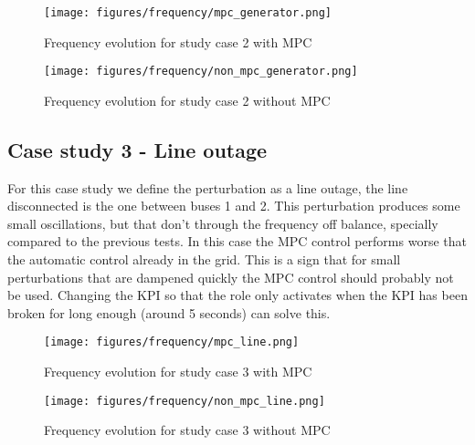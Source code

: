 \documentclass{article}
\begin{document}
\begin{figure}[H]
    \centering

    \begin{minipage}{0.7\textwidth}
        \centering
        \texttt{[image: figures/frequency/mpc\_generator.png]}
        \caption{Frequency evolution for study case 2 with MPC}
        \label{fig:frequency_response_3}
    \end{minipage}

    \vspace{0.5cm}  %

    \begin{minipage}{0.7\textwidth}
        \centering
        \texttt{[image: figures/frequency/non\_mpc\_generator.png]}
        \caption{Frequency evolution for study case 2 without MPC}
        \label{fig:frequency_response_4}
    \end{minipage}

\end{figure}
\subsection{Case study 3 - Line outage}

For this case study we define the perturbation as a line outage, the line disconnected is the one between buses 1 and 2. This perturbation produces some small oscillations, but that don't through the frequency off balance, specially compared to the previous tests. In this case the MPC control performs worse that the automatic control already in the grid. This is a sign that for small perturbations that are dampened quickly the MPC control should probably not be used. Changing the KPI so that the role only activates when the KPI has been broken for long enough (around 5 seconds) can solve this.

\begin{figure}[H]
    \centering

    \begin{minipage}{0.7\textwidth}
        \centering
        \texttt{[image: figures/frequency/mpc\_line.png]}
        \caption{Frequency evolution for study case 3 with MPC}
        \label{fig:frequency_response_5}
    \end{minipage}

    \vspace{0.5cm}  %

    \begin{minipage}{0.7\textwidth}
        \centering
        \texttt{[image: figures/frequency/non\_mpc\_line.png]}
        \caption{Frequency evolution for study case 3 without MPC}
        \label{fig:frequency_response_6}
    \end{minipage}

\end{figure}
\end{document}
